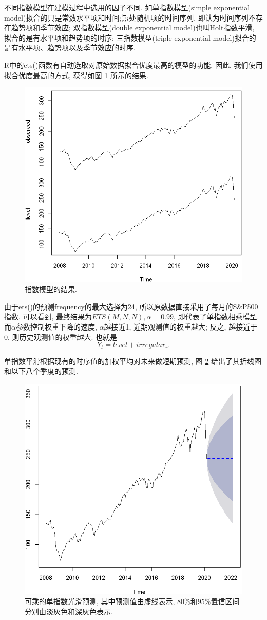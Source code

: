 \documentclass[11pt]{article}
\begin{document}
\qquad 不同指数模型在建模过程中选用的因子不同. 如单指数模型(simple exponential model)拟合的只是常数水平项和时间点$i$处随机项的时间序列, 即认为时间序列不存在趋势项和季节效应; 双指数模型(double exponential model)也叫Holt指数平滑, 拟合的是有水平项和趋势项的时序; 三指数模型(triple exponential model)拟合的是有水平项、趋势项以及季节效应的时序. 

\qquad R中的ets()函数有自动选取对原始数据拟合优度最高的模型的功能, 因此, 我们使用拟合优度最高的方式, 获得如图 \ref{fig:20} 所示的结果.
\begin{figure}
    \centering
    \hspace{-30pt}\includegraphics[width=.46\textwidth]{output_60_0}
    \caption{指数模型的结果.\label{fig:20}}
\end{figure}
\qquad 由于ets()的预测frequency的最大选择为24, 所以原数据直接采用了每月的S\&P500指数. 可以看到, 最终结果为$ETS(M,N,N), \alpha=0.99$, 即代表了单指数相乘模型. 而$\alpha$参数控制权重下降的速度, $\alpha$越接近1, 近期观测值的权重越大; 反之, 越接近于0, 则历史观测值的权重越大. 也就是
\[Y_t=level+irregular_r.\]

\qquad 单指数平滑根据现有的时序值的加权平均对未来做短期预测, 图 \ref{fig:21} 给出了其折线图和以下八个季度的预测. 
\begin{figure}
    \centering
    \hspace{-30pt}\includegraphics[width=.46\textwidth]{output_62_0}
    \caption{\footnotesize 可乘的单指数光滑预测, 其中预测值由虚线表示, $80\%$和$95\%$置信区间分别由淡灰色和深灰色表示.\label{fig:21}}
\end{figure}
\end{document}
